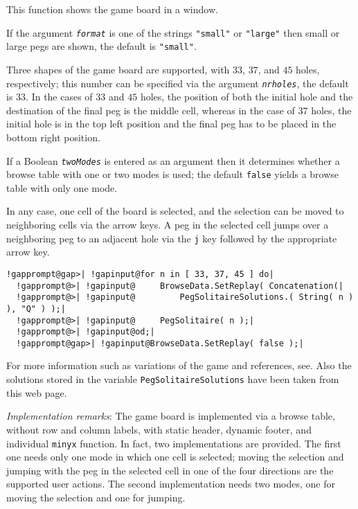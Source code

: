 \documentclass[a4paper,11pt]{report}
\begin{document}
{{{ This function shows the game board in a window. 

 If the argument \mbox{\texttt{\mdseries\slshape format}} is one of the strings \texttt{"small"} or \texttt{"large"} then small or large pegs are shown, the default is \texttt{"small"}. 

 Three shapes of the game board are supported, with $33$, $37$, and $45$ holes, respectively; this number can be specified via the argument \mbox{\texttt{\mdseries\slshape nrholes}}, the default is $33$. In the cases of $33$ and $45$ holes, the position of both the initial hole and the destination of the final
peg is the middle cell, whereas in the case of $37$ holes, the initial hole is in the top left position and the final peg has to
be placed in the bottom right position. 

 If a Boolean \mbox{\texttt{\mdseries\slshape twoModes}} is entered as an argument then it determines whether a browse table with one
or two modes is used; the default \texttt{false} yields a browse table with only one mode. 

 In any case, one cell of the board is selected, and the selection can be moved
to neighboring cells via the arrow keys. A peg in the selected cell jumps over
a neighboring peg to an adjacent hole via the \texttt{j} key followed by the appropriate arrow key. 

 
\begin{Verbatim}[commandchars=!@|,fontsize=\small,frame=single,label=Example]
  !gapprompt@gap>| !gapinput@for n in [ 33, 37, 45 ] do|
  !gapprompt@>| !gapinput@     BrowseData.SetReplay( Concatenation(|
  !gapprompt@>| !gapinput@         PegSolitaireSolutions.( String( n ) ), "Q" ) );|
  !gapprompt@>| !gapinput@     PegSolitaire( n );|
  !gapprompt@>| !gapinput@od;|
  !gapprompt@gap>| !gapinput@BrowseData.SetReplay( false );|
\end{Verbatim}
 

 For more information such as variations of the game and references,
see{\nobreakspace}\cite{PegSolitaireWeb}. Also the solutions stored in the variable \texttt{PegSolitaireSolutions} have been taken from this web page. 

 \emph{Implementation remarks}: The game board is implemented via a browse table, without row and column
labels, with static header, dynamic footer, and individual \texttt{minyx} function. In fact, two implementations are provided. The first one needs only
one mode in which one cell is selected; moving the selection and jumping with
the peg in the selected cell in one of the four directions are the supported
user actions. The second implementation needs two modes, one for moving the
selection and one for jumping. 

}}}
\end{document}

